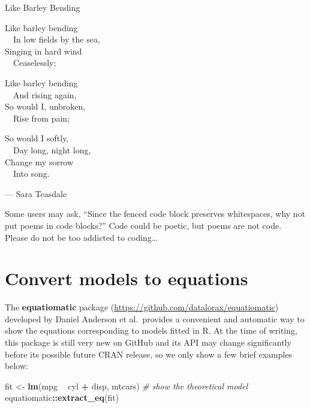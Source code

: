\documentclass[
  11pt,
]{krantz}
\newenvironment{Shaded}{\begin{snugshade}}{\end{snugshade}}
\newcommand{\CommentTok}[1]{\textcolor[rgb]{0.37,0.37,0.37}{\textit{#1}}}
\newcommand{\KeywordTok}[1]{\textcolor[rgb]{0.27,0.27,0.27}{\textbf{#1}}}
\newcommand{\NormalTok}[1]{#1}
\newcommand{\OperatorTok}[1]{\textcolor[rgb]{0.43,0.43,0.43}{\textbf{#1}}}
\newcommand{\StringTok}[1]{\textcolor[rgb]{0.5,0.5,0.5}{#1}}
\renewenvironment{quote}{\begin{VF}}{\end{VF}}
\begin{document}
\begin{quote}
Like Barley Bending

Like barley bending\\
　In low fields by the sea,\\
Singing in hard wind\\
　Ceaselessly;

Like barley bending\\
　And rising again,\\
So would I, unbroken,\\
　Rise from pain;

So would I softly,\\
　Day long, night long,\\
Change my sorrow\\
　Into song.

\begin{flushright}

--- Sara Teasdale

\end{flushright}
\end{quote}

Some users may ask, ``Since the fenced code block preserves whitespaces, why not put poems in code blocks?'' Code could be poetic, but poems are not code. Please do not be too addicted to coding\ldots{}

\hypertarget{equatiomatic}{%
\section{Convert models to equations}\label{equatiomatic}}

The \textbf{equatiomatic} package (\url{https://github.com/datalorax/equatiomatic}) developed by Daniel Anderson et al.~provides a convenient and automatic way to show the equations corresponding to models fitted in R. At the time of writing, this package is still very new on GitHub and its API may change significantly before its possible future CRAN release, so we only show a few brief examples below:

\begin{Shaded}
\begin{Highlighting}[]
\NormalTok{fit <-}\StringTok{ }\KeywordTok{lm}\NormalTok{(mpg }\OperatorTok{~}\StringTok{ }\NormalTok{cyl }\OperatorTok{+}\StringTok{ }\NormalTok{disp, mtcars)}
\CommentTok{# show the theoretical model}
\NormalTok{equatiomatic}\OperatorTok{::}\KeywordTok{extract_eq}\NormalTok{(fit)}
\end{Highlighting}
\end{Shaded}
\end{document}
